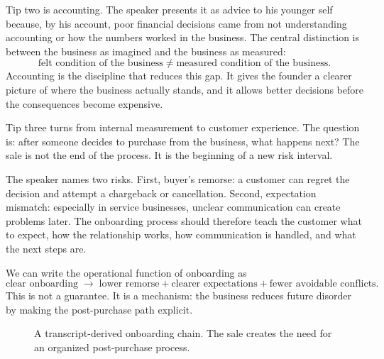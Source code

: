 Tip two is accounting. The speaker presents it as advice to his younger self because, by his account, poor financial decisions came from not understanding accounting or how the numbers worked in the business. The central distinction is between the business as imagined and the business as measured:
\[
\text{felt condition of the business}
\neq
\text{measured condition of the business}.
\]
Accounting is the discipline that reduces this gap. It gives the founder a clearer picture of where the business actually stands, and it allows better decisions before the consequences become expensive.

Tip three turns from internal measurement to customer experience. The question is: after someone decides to purchase from the business, what happens next? The sale is not the end of the process. It is the beginning of a new risk interval.

The speaker names two risks. First, buyer's remorse: a customer can regret the decision and attempt a chargeback or cancellation. Second, expectation mismatch: especially in service businesses, unclear communication can create problems later. The onboarding process should therefore teach the customer what to expect, how the relationship works, how communication is handled, and what the next steps are.

We can write the operational function of onboarding as
\[
\text{clear onboarding}
\;\longrightarrow\;
\text{lower remorse}
+
\text{clearer expectations}
+
\text{fewer avoidable conflicts}.
\]
This is not a guarantee. It is a mechanism: the business reduces future disorder by making the post-purchase path explicit.

\begin{figure}
\centering
{}
\caption{A transcript-derived onboarding chain. The sale creates the need for an organized post-purchase process.}
\end{figure}

